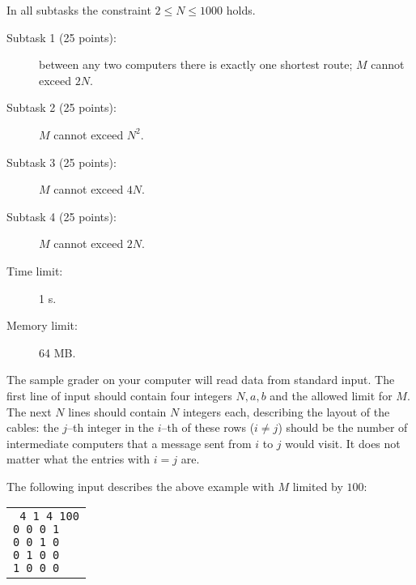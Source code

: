 \documentclass{boi2014}
\begin{document}
    \Scoring
    In all subtasks the constraint $2 \le N \le 1000$ holds.

    \begin{description}

        \item[Subtask 1 (25 points):] between
            any two computers there is exactly one shortest route; $M$
            cannot exceed $2N$.
        \item[Subtask 2 (25 points):] $M$ cannot exceed $N^2$.
        \item[Subtask 3 (25 points):] $M$ cannot exceed $4N$.
        \item[Subtask 4 (25 points):] $M$ cannot exceed $2N$.
    \end{description}

    \Constraints
    \begin{description}
        \item[Time limit:] 1 s.
        \item[Memory limit:] 64 MB.
    \end{description}

    \Experimentation
    The sample grader on your computer will read data from standard input.
    The first line of input should contain four integers $N, a, b$ and the
    allowed limit for $M$. The next $N$ lines should
    contain $N$ integers each, describing the layout of the cables:
    the $j$--th integer in the $i$--th of these rows ($i \neq j$) should be
    the number of intermediate computers that a message sent from $i$ to $j$
    would visit. It does not matter what the entries with $i = j$ are.

    The following input describes the above example with $M$ limited by
    $100$:

    \begin{center}
        \begin{tabular}{p{4cm}}
            {\tt
                4 1 4 100 \newline
                0 0 0 1 \newline
                0 0 1 0 \newline
                0 1 0 0 \newline
                1 0 0 0
            }
        \end{tabular}
    \end{center}
\end{document}
